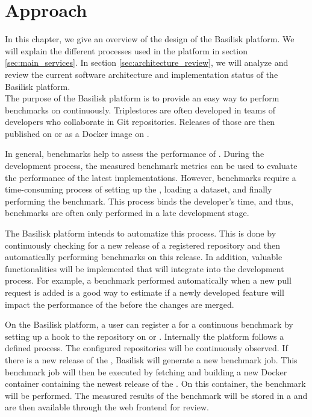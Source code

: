 \chapter{Approach}
\label{ch:approach}

In this chapter, we give an overview of the design of the Basilisk platform.
We will explain the different processes used in the platform in section \ref{sec:main_services}.
In section \ref{sec:architecture_review}, we will analyze and review the current software architecture and implementation status of the Basilisk platform.
\\

The purpose of the Basilisk platform is to provide an easy way to perform benchmarks on \tsp{} continuously.
Triplestores are often developed in teams of developers who collaborate in Git repositories.
Releases of those \tsp{} are then published on \gh{} or as a Docker image on \dockh{}.

In general, benchmarks help to assess the performance of \ts{}.
During the development process, the measured benchmark metrics can be used to evaluate the performance of the latest implementations.
However, benchmarks require a time-consuming process of setting up the \ts{}, loading a dataset, and finally performing the benchmark.
This process binds the developer's time, and thus, benchmarks are often only performed in a late development stage.

The Basilisk platform intends to automatize this process.
This is done by continuously checking for a new release of a registered \ts{} repository and then automatically performing benchmarks on this release.
In addition, valuable functionalities will be implemented that will integrate into the development process.
For example, a benchmark performed automatically when a new pull request is added is a good way to estimate if a newly developed feature will impact the performance of the \ts{} before the changes are merged.

On the Basilisk platform, a user can register a \ts{} for a continuous benchmark by setting up a hook to the repository on \gh{} or \dockh{}.
Internally the platform follows a defined process.
The configured repositories will be continuously observed.
If there is a new release of the \ts{}, Basilisk will generate a new benchmark job.
This benchmark job will then be executed by fetching and building a new Docker container containing the newest release of the \ts{}.
On this container, the benchmark will be performed.
The measured results of the benchmark will be stored in a \ts{} and are then available through the web frontend for review.
\\


